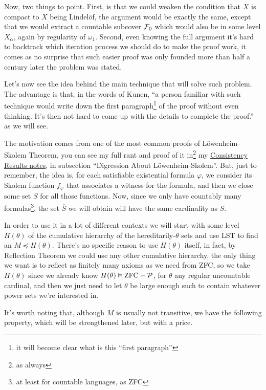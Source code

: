 Now, two things to point. First, is that we could weaken the condition that $X$ is compact to $X$ being Lindelöf, the argument would be exactly the same, except that we would extract a countable subcover $\mathcal{F}_0$ which would also be in some level $X_\alpha$, again by regularity of $\omega_1$. Second, even knowing the full argument it's hard to backtrack which iteration process we should do to make the proof work, it comes as no surprise that such easier proof was only founded more than half a century later the problem was stated.

Let's now see the idea behind the main technique that will solve such problem. The advantage is that, in the words of Kunen, ``a person familiar with such technique would write down the first paragraph\footnote{it will become clear what is this ``first paragraph''} of the proof without even thinking. It's then not hard to come up with the details to complete the proof.'' as we will see.

The motivation comes from one of the most common proofs of Löwenheim-Skolem Theorem, you can see my full rant and proof of it in\footnote{as always} my \href{https://github.com/Xennonio/Consistency-Results}{Consistency Results notes}, in subsection ``Digression About Löwenheim-Skolem''. But, just to remember, the idea is, for each satisfiable existential formula $\varphi$, we consider its Skolem function $f_\varphi$ that associates a witness for the formula, and then we close some set $S$ for all those functions. Now, since we only have countably many formulas\footnote{at least for countable languages, as ZFC}, the set $\overline{S}$ we will obtain will have the same cardinality as $S$.

In order to use it in a lot of different contexts we will start with some level $H(\theta)$ of the cumulative hierarchy of the hereditarily-$\theta$ sets and use LST to find an $M\preccurlyeq H(\theta)$. There's no specific reason to use $H(\theta)$ itself, in fact, by Reflection Theorem we could use any other cumulative hierarchy, the only thing we want is to reflect as finitely many axioms as we need from ZFC, so we take $H(\theta)$ since we already know $H(\theta)\vDash\mathrm{ZFC}-\mathcal{P}$, for $\theta$ any regular uncountable cardinal, and then we just need to let $\theta$ be large enough such to contain whatever power sets we're interested in.

It's worth noting that, although $M$ is usually not transitive, we have the following property, which will be strengthened later, but with a price.


